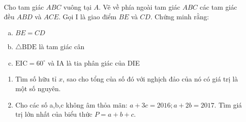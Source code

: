 \begin{bt}
	Cho tam giác $A B C$ vuông tại $A$. Vẽ về phía ngoài tam giác $A B C$ các tam giác đều $A B D$ và $A C E$. Gọi $\mathrm{I}$ là giao điểm $B E$ và $C D$. Chứng minh rằng:
	\begin{enumerate}[a.]
		\item $B E=C D$
		\item $\triangle \mathrm{BDE}$ là tam giác cân
		\item $\mathrm{EIC}=60^{\circ}$ và IA là tia phân giác của DIE
	\end{enumerate}
	\loigiai{}
\end{bt}

\begin{bt}
	\hfill
	\begin{enumerate}[1.] 
		\item Tìm số hữu tỉ $x$, sao cho tổng của số đó với nghịch đảo của nó có giá trị là một số nguyên.
		\item Cho các số a,b,c không âm thỏa mãn: $a+3 c=2016 ; a+2 b=2017$. Tìm giá trị lớn nhất của biểu thức $P=a+b+c$.
	\end{enumerate}
	\loigiai{}
\end{bt}